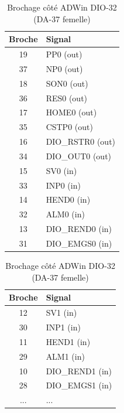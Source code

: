 \documentclass[a4paper,11pt]{beamer}
\begin{document}
\begin{frame}
\begin{table}[htbp]
  \centering
  \caption{Brochage côté ADWin DIO-32 (DA-37 femelle)}
  \label{tab:brochage-x1}
  \tiny
  \setlength{\tabcolsep}{2pt}
  \begin{tabular}[t]{cl}
    \toprule
    \textbf{Broche} & \textbf{Signal} \\
    \midrule
    19 & PP0 (out) \\
    37 & NP0 (out)\\
    18 & SON0 (out)\\
    36 & RES0 (out)\\
    17 & HOME0 (out)\\
    35 & CSTP0 (out)\\
    16 & DIO\_RSTR0 (out)\\
    34 & DIO\_OUT0 (out)\\
    15 & SV0 (in)\\
    33 & INP0 (in)\\
    14 & HEND0 (in)\\
    32 & ALM0 (in)\\
    13 & DIO\_REND0 (in)\\
    31 & DIO\_EMGS0 (in)\\
    \bottomrule
  \end{tabular}
  \hspace{1mm}
  \begin{tabular}[t]{cl}
    \toprule
    \textbf{Broche} & \textbf{Signal} \\
    \midrule
    12 & SV1 (in) \\
    30 & INP1 (in)\\
    11 & HEND1 (in)\\
    29 & ALM1 (in)\\
    10 & DIO\_REND1 (in)\\
    28 & DIO\_EMGS1 (in)\\
    ...			&...\\


\end{tabular}
\end{table}
\end{frame}
\end{document}
